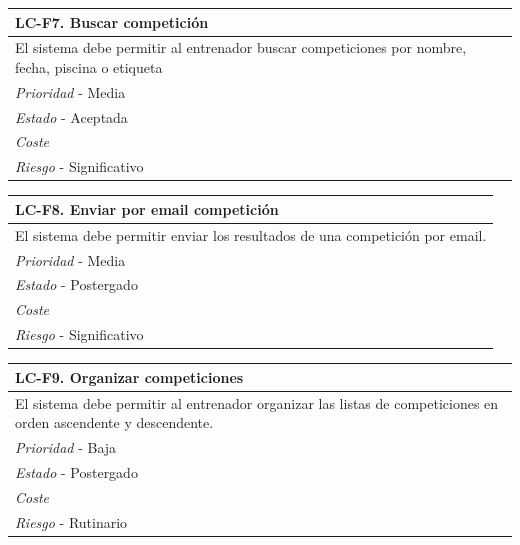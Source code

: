 	\begin{center}
		\begin{tabularx}{15cm}{|X|}
			\hline 
				\bf{LC-F7. Buscar competición}\\
			\hline
				El sistema debe permitir al entrenador buscar competiciones por nombre, fecha, piscina o etiqueta\\
			\hline
				{\it Prioridad} - Media\\
			\hline
				{\it Estado} - Aceptada\\
			\hline
				{\it Coste}\\
			\hline
				{\it Riesgo} - Significativo\\
			\hline
		\end{tabularx}
	\end{center}
	
	\begin{center}
		\begin{tabularx}{15cm}{|X|}
			\hline 
				\bf{LC-F8. Enviar por email competición}\\
			\hline
				El sistema debe permitir enviar los resultados de una competición por email.\\
			\hline
				{\it Prioridad} - Media\\
			\hline
				{\it Estado} - Postergado\\
			\hline
				{\it Coste}\\
			\hline
				{\it Riesgo} - Significativo\\
			\hline
		\end{tabularx}
	\end{center}
	
	\begin{center}
		\begin{tabularx}{15cm}{|X|}
			\hline 
				\bf{LC-F9. Organizar competiciones}\\
			\hline
				El sistema debe permitir al entrenador organizar las listas de competiciones en orden ascendente y descendente.\\
			\hline
				{\it Prioridad} - Baja\\
			\hline
				{\it Estado} - Postergado\\
			\hline
				{\it Coste}\\
			\hline
				{\it Riesgo} - Rutinario\\
			\hline
		\end{tabularx}
	\end{center}
	

